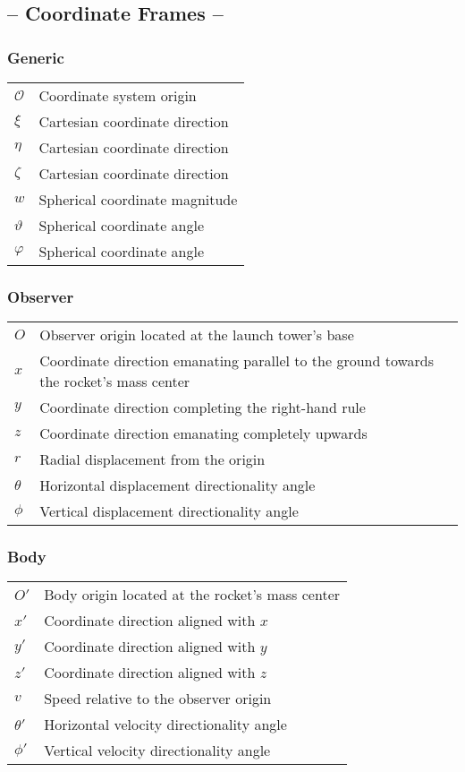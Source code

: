 \documentclass[11pt]{thesis}
\numberwithin{equation}{section}
\begin{document}
\subsection*{-- Coordinate Frames --}
\subsubsection*{Generic}
\begin{longtable}[l]{l l}
$\mathcal{O}$ & Coordinate system origin \\
$\xi$ & Cartesian coordinate direction \\
$\eta$ & Cartesian coordinate direction \\
$\zeta$ & Cartesian coordinate direction \\
$w$ & Spherical coordinate magnitude \\
$\vartheta$ & Spherical coordinate angle \\
$\varphi$ & Spherical coordinate angle
\end{longtable}
\subsubsection*{Observer}
\begin{longtable}[l]{l l}
$\mathit{O}$ & Observer origin located at the launch tower's base \\
$x$ & Coordinate direction emanating parallel to the ground towards the rocket's mass center\\
$y$ & Coordinate direction completing the right-hand rule \\
$z$ & Coordinate direction emanating completely upwards \\
$r$ & Radial displacement from the origin \\
$\theta$ & Horizontal displacement directionality angle \\
$\phi$ & Vertical displacement directionality angle
\end{longtable}
\subsubsection*{Body}
\begin{longtable}[l]{l l}
$\mathit{O'}$ & Body origin located at the rocket's mass center  \\
$x'$ & Coordinate direction aligned with $x$ \\
$y'$ & Coordinate direction aligned with $y$ \\
$z'$ & Coordinate direction aligned with $z$ \\
$v$ & Speed relative to the observer origin \\
$\theta'$ & Horizontal velocity directionality angle \\
$\phi'$ & Vertical velocity directionality angle
\end{longtable}
\end{document}
